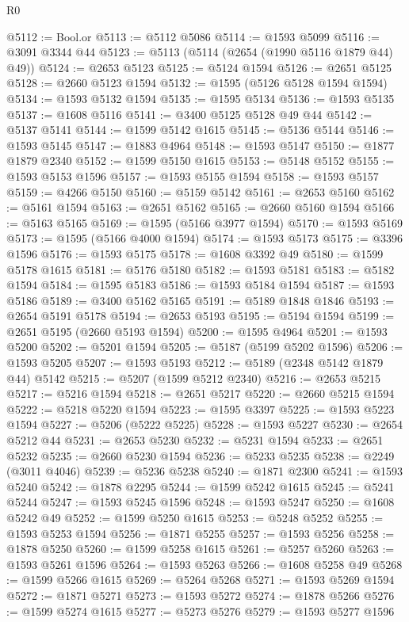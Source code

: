 \begin{lexlean}{R0}
\begin{coremodule}
@5112 := Bool.or
@5113 := @5112 @5086
@5114 := @1593 @5099
@5116 := @3091 @3344 @44
@5123 := @5113 (@5114 (@2654 (@1990 @5116 @1879 @44) @49))
@5124 := @2653 @5123
@5125 := @5124 @1594
@5126 := @2651 @5125
@5128 := @2660 @5123 @1594
@5132 := @1595 (@5126 @5128 @1594 @1594)
@5134 := @1593 @5132 @1594
@5135 := @1595 @5134
@5136 := @1593 @5135
@5137 := @1608 @5116
@5141 := @3400 @5125 @5128 @49 @44
@5142 := @5137 @5141
@5144 := @1599 @5142 @1615
@5145 := @5136 @5144
@5146 := @1593 @5145
@5147 := @1883 @4964
@5148 := @1593 @5147
@5150 := @1877 @1879 @2340
@5152 := @1599 @5150 @1615
@5153 := @5148 @5152
@5155 := @1593 @5153 @1596
@5157 := @1593 @5155 @1594
@5158 := @1593 @5157
@5159 := @4266 @5150
@5160 := @5159 @5142
@5161 := @2653 @5160
@5162 := @5161 @1594
@5163 := @2651 @5162
@5165 := @2660 @5160 @1594
@5166 := @5163 @5165
@5169 := @1595 (@5166 @3977 @1594)
@5170 := @1593 @5169
@5173 := @1595 (@5166 @4000 @1594)
@5174 := @1593 @5173
@5175 := @3396 @1596
@5176 := @1593 @5175
@5178 := @1608 @3392 @49
@5180 := @1599 @5178 @1615
@5181 := @5176 @5180
@5182 := @1593 @5181
@5183 := @5182 @1594
@5184 := @1595 @5183
@5186 := @1593 @5184 @1594
@5187 := @1593 @5186
@5189 := @3400 @5162 @5165
@5191 := @5189 @1848 @1846
@5193 := @2654 @5191 @5178
@5194 := @2653 @5193
@5195 := @5194 @1594
@5199 := @2651 @5195 (@2660 @5193 @1594)
@5200 := @1595 @4964
@5201 := @1593 @5200
@5202 := @5201 @1594
@5205 := @5187 (@5199 @5202 @1596)
@5206 := @1593 @5205
@5207 := @1593 @5193
@5212 := @5189 (@2348 @5142 @1879 @44) @5142
@5215 := @5207 (@1599 @5212 @2340)
@5216 := @2653 @5215
@5217 := @5216 @1594
@5218 := @2651 @5217
@5220 := @2660 @5215 @1594
@5222 := @5218 @5220 @1594
@5223 := @1595 @3397
@5225 := @1593 @5223 @1594
@5227 := @5206 (@5222 @5225)
@5228 := @1593 @5227
@5230 := @2654 @5212 @44
@5231 := @2653 @5230
@5232 := @5231 @1594
@5233 := @2651 @5232
@5235 := @2660 @5230 @1594
@5236 := @5233 @5235
@5238 := @2249 (@3011 @4046)
@5239 := @5236 @5238
@5240 := @1871 @2300
@5241 := @1593 @5240
@5242 := @1878 @2295
@5244 := @1599 @5242 @1615
@5245 := @5241 @5244
@5247 := @1593 @5245 @1596
@5248 := @1593 @5247
@5250 := @1608 @5242 @49
@5252 := @1599 @5250 @1615
@5253 := @5248 @5252
@5255 := @1593 @5253 @1594
@5256 := @1871 @5255
@5257 := @1593 @5256
@5258 := @1878 @5250
@5260 := @1599 @5258 @1615
@5261 := @5257 @5260
@5263 := @1593 @5261 @1596
@5264 := @1593 @5263
@5266 := @1608 @5258 @49
@5268 := @1599 @5266 @1615
@5269 := @5264 @5268
@5271 := @1593 @5269 @1594
@5272 := @1871 @5271
@5273 := @1593 @5272
@5274 := @1878 @5266
@5276 := @1599 @5274 @1615
@5277 := @5273 @5276
@5279 := @1593 @5277 @1596

\end{coremodule}
\end{lexlean}
